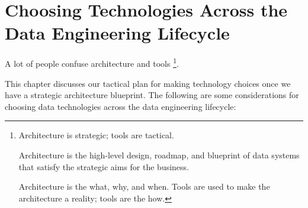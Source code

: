\section{Choosing Technologies Across the Data Engineering Lifecycle}
A lot of people confuse architecture and tools
\footnote{
    Architecture is strategic; tools are tactical.

    Architecture is the high-level design, roadmap,
    and blueprint of data systems that satisfy
    the strategic aims for the business.

    Architecture is the what, why, and when.
    Tools are used to make the architecture a
    reality; tools are the how.
}.

This chapter discusses our tactical plan for making
technology choices once we have a strategic architecture
blueprint. The following are some considerations for choosing
data technologies across the data engineering lifecycle:

